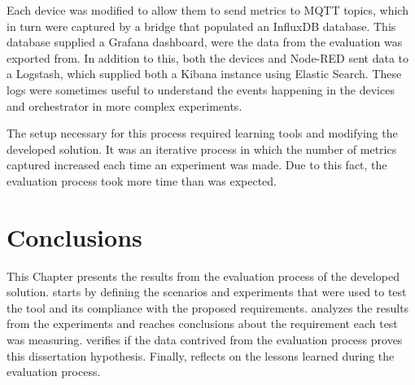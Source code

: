 Each device was modified to allow them to send metrics to MQTT topics, which in turn were captured by a bridge that populated an InfluxDB database. This database supplied a Grafana dashboard, were the data from the evaluation was exported from. In addition to this, both the devices and Node-RED sent data to a Logstash, which supplied both a Kibana instance using Elastic Search. These logs were sometimes useful to understand the events happening in the devices and orchestrator in more complex experiments.

The setup necessary for this process required learning tools and modifying the developed solution. It was an iterative process in which the number of metrics captured increased each time an experiment was made. Due to this fact, the evaluation process took more time than was expected.

\section{Conclusions}\label{sec:evaluation_conclusions}

This Chapter presents the results from the evaluation process of the developed solution.  starts by defining the scenarios and experiments that were used to test the tool and its compliance with the proposed requirements.  analyzes the results from the experiments and reaches conclusions about the requirement each test was measuring.  verifies if the data contrived from the evaluation process proves this dissertation hypothesis. Finally,  reflects on the lessons learned during the evaluation process. 

